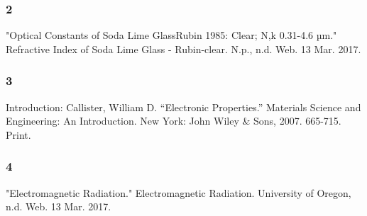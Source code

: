 \documentclass{article}
\begin{document}
\subsubsection*{2}
"Optical Constants of Soda Lime GlassRubin 1985: Clear; N,k 0.31-4.6 µm." Refractive Index of Soda Lime Glass - Rubin-clear. N.p., n.d. Web. 13 Mar. 2017.
\subsubsection*{3}
Introduction:
Callister, William D. “Electronic Properties.” Materials Science and Engineering: An Introduction. New York: John Wiley \& Sons, 2007. 665-715. Print.    
\subsubsection*{4}
"Electromagnetic Radiation." Electromagnetic Radiation. University of Oregon, n.d. Web. 13 Mar. 2017.
\end{document}
